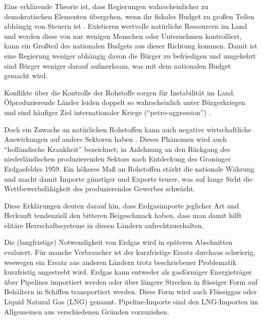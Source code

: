 Eine erklärende Theorie ist, dass Regierungen wahrscheinlicher zu demokratischen Elementen übergehen, wenn ihr fiskales Budget zu großen Teilen abhängig von Steuern ist \cite{nrgi}. Existieren wertvolle natürliche Ressourcen im Land und werden diese von nur wenigen Menschen oder Unternehmen kontrolliert, kann ein Großteil des nationalen Budgets aus dieser Richtung kommen. Damit ist eine Regierung weniger abhängig davon die Bürger zu befriedigen und umgekehrt sind Bürger weniger darauf aufmerksam, was mit dem nationalen Budget gemacht wird. 

Konflikte über die Kontrolle der Rohstoffe sorgen für Instabilität im Land. Ölproduzierende Länder leiden doppelt so wahrscheinlich unter Bürgerkriegen und sind häufiger Ziel internationaler Kriege (``petro-aggression'') \cite{nrgi}.

Doch ein Zuwachs an natürlichen Rohstoffen kann auch negative wirtschaftliche Auswirkungen auf andere Sektoren haben \cite{nrgi}. Dieses Phänomen wird auch ``holländische Krankheit'' bezeichnet; in Anlehnung an den Rückgang des niederländischen produzierenden Sektors nach Entdeckung des Groninger Erdgasfeldes 1959. Ein höheres Maß an Rohstoffen stärkt die nationale Währung und macht damit Importe günstiger und Exporte teurer, was auf lange Sicht die Wettbewerbsfähigkeit des produzierendes Gewerbes schwächt.

Diese Erklärungen deuten darauf hin, dass Erdgasimporte jeglicher Art und Herkunft tendenziell den bitteren Beigeschmack haben, dass man damit hilft elitäre Herrschaftssysteme in diesen Ländern aufrechtzuerhalten.

Die (langfristige) Notwendigkeit von Erdgas wird in späteren Abschnitten evaluiert. Für manche Verbraucher ist der kurzfristige Ersatz durchaus schwierig, weswegen ein Ersatz aus anderen Ländern trotz beschriebener Problematik kurzfristig angestrebt wird. Erdgas kann entweder als gasförmiger Energieträger über Pipelines importiert werden oder über längere Strecken in flüssiger Form auf Behältern in Schiffen transportiert werden. Diese Form wird auch Flüssiggas oder Liquid Natural Gas (LNG) genannt. Pipeline-Importe sind den LNG-Importen im Allgemeinen aus verschiedenen Gründen vorzuziehen. 

